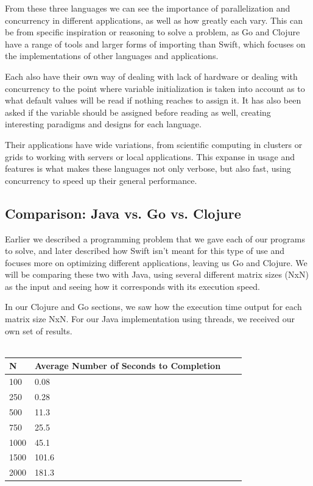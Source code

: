 From these three languages we can see the importance of parallelization and concurrency in different applications, as well as how greatly each vary. This can be from specific inspiration or reasoning to solve a problem, as Go and Clojure have a range of tools and larger forms of importing than Swift, which focuses on the implementations of other languages and applications.

Each also have their own way of dealing with lack of hardware or dealing with concurrency to the point where variable initialization is taken into account as to what default values will be read if nothing reaches to assign it. It has also been asked if the variable should be assigned before reading as well, creating interesting paradigms and designs for each language.

Their applications have wide variations, from scientific computing in clusters or grids to working with servers or local applications. This expanse in usage and features is what makes these languages not only verbose, but also fast, using concurrency to speed up their general performance.

\subsection{Comparison: Java vs. Go vs. Clojure}
    Earlier we described a programming problem that we gave each of our programs to solve, and later described how Swift isn't meant for this type of use and focuses more on optimizing different applications, leaving us Go and Clojure. We will be comparing these two with Java, using several different matrix sizes (NxN) as the input and seeing how it corresponds with its execution speed.

    In our Clojure and Go sections, we saw how the execution time output for each matrix size NxN. For our Java implementation using threads, we received our own set of results.
    \\~\\
    \begin{tabular}{ | l | l | l | p{5cm} |}
    \hline
    N & Average Number of Seconds to Completion \\ \hline
    100 & 0.08 \\ \hline
    250 & 0.28 \\ \hline
    500 & 11.3 \\ \hline
    750 & 25.5 \\ \hline
    1000 & 45.1 \\ \hline
    1500 & 101.6 \\ \hline
    2000 & 181.3 \\ \hline

    \hline
    \end{tabular}\\~\\

